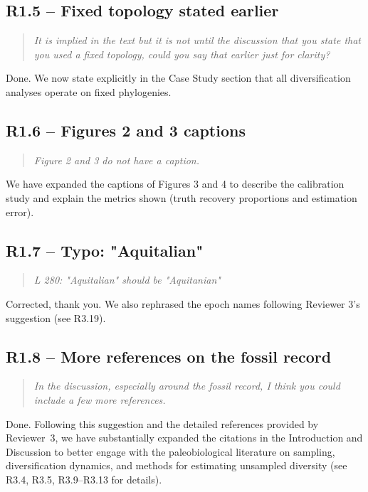 \documentclass[11pt]{article}
\newenvironment{RC}{\begin{quote}\itshape}{\end{quote}}
\newcommand{\response}[1]{\noindent\textcolor{resp}{#1}\medskip}
\begin{document}
\subsection*{R1.5 -- Fixed topology stated earlier}

\begin{RC}
It is implied in the text but it is not until the discussion that you state that you used a fixed topology, could you say that earlier just for clarity?
\end{RC}

\response{Done. We now state explicitly in the Case Study section that all diversification analyses operate on fixed phylogenies.}

\subsection*{R1.6 -- Figures 2 and 3 captions}

\begin{RC}
Figure 2 and 3 do not have a caption.
\end{RC}

\response{We have expanded the captions of Figures 3 and 4 to describe the calibration study and explain the metrics shown (truth recovery proportions and estimation error).}

\subsection*{R1.7 -- Typo: "Aquitalian"}

\begin{RC}
L 280: "Aquitalian" should be "Aquitanian"
\end{RC}

\response{Corrected, thank you. We also rephrased the epoch names following Reviewer 3's suggestion (see R3.19).}

\subsection*{R1.8 -- More references on the fossil record}

\begin{RC}
In the discussion, especially around the fossil record, I think you could include a few more references.
\end{RC}

\response{Done. Following this suggestion and the detailed references provided by Reviewer~3, we have substantially expanded the citations in the Introduction and Discussion to better engage with the paleobiological literature on sampling, diversification dynamics, and methods for estimating unsampled diversity (see R3.4, R3.5, R3.9--R3.13 for details).}
\end{document}
